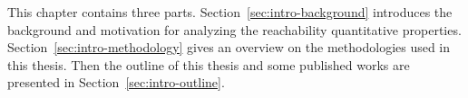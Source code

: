 This chapter contains three parts.
Section~\ref{sec:intro-background} introduces the background and motivation for analyzing
the reachability quantitative properties.
Section~\ref{sec:intro-methodology} gives an overview on the methodologies used in this thesis.
Then the outline of this thesis and some published works are presented in Section~\ref{sec:intro-outline}. 